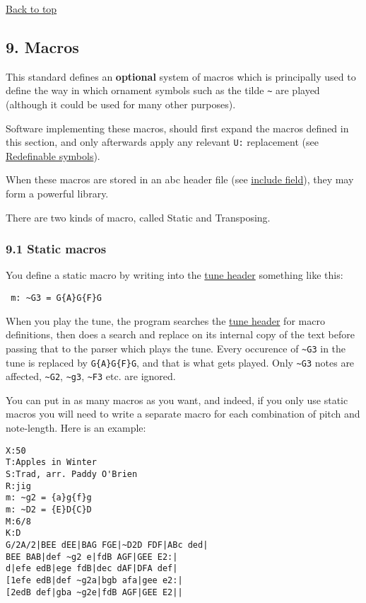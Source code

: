 \protect\hyperlink{}{Back to top}

\hypertarget{macros}{\subsection{9. Macros}\label{macros}}

This standard defines an \textbf{optional} system of macros which is
principally used to define the way in which ornament symbols such as the
tilde \texttt{\textasciitilde{}} are played (although it could be used
for many other purposes).

Software implementing these macros, should first expand the macros
defined in this section, and only afterwards apply any relevant
\texttt{U:} replacement (see
\protect\hyperlink{redefinable_symbols}{Redefinable symbols}).

When these macros are stored in an abc header file (see
\protect\hyperlink{include_field}{include field}), they may form a
powerful library.

There are two kinds of macro, called Static and Transposing.

\hypertarget{static_macros}{\subsubsection{9.1 Static
macros}\label{static_macros}}

You define a static macro by writing into the
\protect\hyperlink{tune_header_definition}{tune header} something like
this:

\begin{verbatim}
 m: ~G3 = G{A}G{F}G
\end{verbatim}

When you play the tune, the program searches the
\protect\hyperlink{tune_header_definition}{tune header} for macro
definitions, then does a search and replace on its internal copy of the
text before passing that to the parser which plays the tune. Every
occurence of \texttt{\textasciitilde{}G3} in the tune is replaced by
\texttt{G\{A\}G\{F\}G}, and that is what gets played. Only
\texttt{\textasciitilde{}G3} notes are affected,
\texttt{\textasciitilde{}G2}, \texttt{\textasciitilde{}g3},
\texttt{\textasciitilde{}F3} etc. are ignored.

You can put in as many macros as you want, and indeed, if you only use
static macros you will need to write a separate macro for each
combination of pitch and note-length. Here is an example:

\begin{verbatim}
X:50
T:Apples in Winter
S:Trad, arr. Paddy O'Brien
R:jig
m: ~g2 = {a}g{f}g
m: ~D2 = {E}D{C}D
M:6/8
K:D
G/2A/2|BEE dEE|BAG FGE|~D2D FDF|ABc ded|
BEE BAB|def ~g2 e|fdB AGF|GEE E2:|
d|efe edB|ege fdB|dec dAF|DFA def|
[1efe edB|def ~g2a|bgb afa|gee e2:|
[2edB def|gba ~g2e|fdB AGF|GEE E2||
\end{verbatim}

